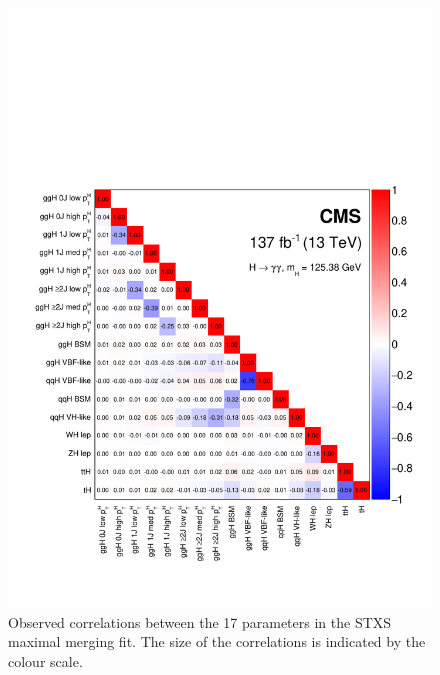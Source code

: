 \begin{figure}[htb!]
  \centering
  \includegraphics[width=.9\textwidth]{Figures/hgg_results/stage1p2_maximal_correlations.pdf}
  \vspace{-.5cm}
  \caption[Correlations in the maximal merging parameters]
  {
    Observed correlations between the 17 parameters in the STXS maximal merging fit. The size of the correlations is indicated by the colour scale.
  }
  \label{fig:stage1p2_maximal_correlations}
\end{figure}

